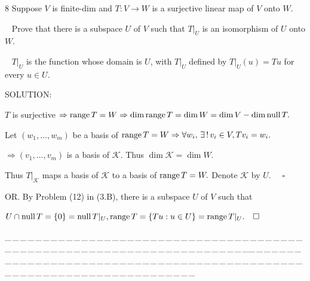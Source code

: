 \documentclass[a4paper, 11pt, UTF8]{article}
\def\range{\textup{range}\,}
\def\null{\textup{null\,}}
\begin{document}
\begin{large}
{\timesbf\Large 8} {\timessl\Large 
Suppose $V$ is finite-dim and $T: V\rightarrow W$ is a surjective linear map of $V$ onto $W$.}\par\,\,\,
{\timessl\Large Prove that there is a subspace $U$ of $V$ such that $T|_U$ is an isomorphism of $U$ onto $W$.}\par\,\,\,
{\timessl\small
$T|_U$ is the function whose domain is $U$, with $T|_U$ defined by $T|_U (u) = Tu$ for every $u\in U$.
}\par
{\timesbf S\footnotesize{OLUTION:}}\par\quad
$T$ is surjective $\Rightarrow\range T=W\Rightarrow\dim\range T=\dim W=\dim V-\dim\null T.$\par\quad
Let $(w_1,\dots,w_m)$ be a basis of $\range T=W\Rightarrow\forall w_i,\,\exists\,!\,v_i\in V,Tv_i=w_i.$\par\quad
$\Rightarrow(v_1,\dots,v_m)$ is a basis of $\mathcal{K}$. Thus $\dim\mathcal{K}=\dim W$.\par\quad
Thus $T|_\mathcal{K}$ maps a basis of $\mathcal{K}$ to a basis of $\range T=W.$ Denote $\mathcal{K}$ by $U$. $\quad\square$\par\quad
O{\small R.} By Problem (12) in (3.B), there is a subspace $U$ of $V$ such that\par\quad
$U\cap \null T=\{0\}=\null T|_U,\range T=\{Tu:u\in U\}=\range T|_U.\quad\square$\par
{\tiny \_\,\_\,\_\,\_\,\_\,\_\,\_\,\_\,\_\,\_\,\_\,\_\,\_\,\_\,\_\,\_\,\_\,\_\,\_\,\_\,\_\,\_\,\_\,\_\,\_\,\_\,\_\,\_\,\_\,\_\,\_\,\_\,\_\,\_\,\_\,\_\,\_\,\_\,\_\,\_\,\_\,\_\,\_\,\_\,\_\,\_\,\_\,\_\,\_\,\_\,\_\,\_\,\_\,\_\,\_\,\_\,\_\,\_\,\_\,\_\,\_\,\_\,\_\,\_\,\_\,\_\,\_\,\_\,\_\,\_\,\_\_\,\_\,\_\,\_\,\_\,\_\,\_\,\_\,\_\,\_\,\_\,\_\,\_\,\_\,\_\,\_\,\_\,\_\,\_\,\_\,\_\,\_\,\_\,\_\,\_\,\_\,\_\,\_\,\_\,\_\,\_\,\_\,\_\,\_\,\_\,\_\,\_\,\_\,\_\,\_\,\_\,\_\,\_\,\_\,\_\,\_\,\_\,\_\,\_\,\_\,\_\,\_\,\_\,\_\,\_\,\_\,\_\,\_\,\_\,\_\,\_\,\_\,\_\,\_\,\_\,\_\,\_\,\_\,\_\,\_\,\_}\par


\end{large}
\end{document}
